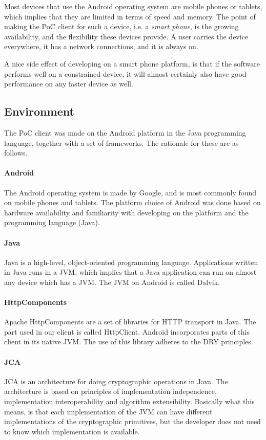 \documentclass[pdftex,english,10pt,b5paper,twoside]{book}
\begin{document}
Most devices that use the Android operating system are mobile phones or
tablets, which implies that they are limited in terms of speed and
memory. The point of making the \ac{PoC} client for such a device, i.e. a
\emph{smart phone}, is the growing availability, and the flexibility these
devices provide. A user carries the device everywhere, it has a network
connections, and it is always on.

A nice side effect of developing on a smart phone platform, is that if the
software performs well on a constrained device, it will almost certainly also
have good performance on any faster device as well.

\subsection{Environment}
The \ac{PoC} client was made on the Android platform in the Java programming
language, together with a set of frameworks. The rationale for these are as
follows.

\paragraph{Android} The Android operating system is made by Google, and is most
commonly found on mobile phones and tablets. The platform choice of Android was done
based on hardware availability and familiarity with developing on the
platform and the programming language (Java).

\paragraph{Java} Java is a high-level, object-oriented programming language.
Applications written in Java runs in a \ac{JVM}, which implies that a Java
application can run on almost any device which has a \ac{JVM}. The \ac{JVM} on
Android is called Dalvik.

\paragraph{HttpComponents} Apache HttpComponents are a set of libraries for
\ac{HTTP} transport in Java. The part used in our client is called HttpClient.
Android incorporates parts of this client in its native \ac{JVM}. The use of
this library adheres to the \ac{DRY} principles.

\paragraph{\ac{JCA}} \ac{JCA} is an architecture for doing cryptographic
operations in Java. The architecture is based on principles of implementation
independence, implementation interoperability and algorithm extensibility.
Basically what this means, is that each implementation of the \ac{JVM} can have
different implementations of the cryptographic primitives, but the developer
does not need to know which implementation is available.
\end{document}
